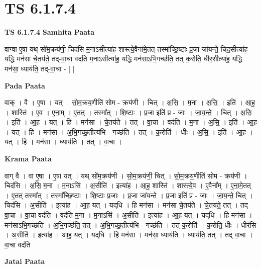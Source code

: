 \documentclass[17pt]{extarticle}
\begin{document}
\section{ TS 6.1.7.4 }

\textbf{TS 6.1.7.4 } \newline
\textbf{Samhita Paata} \newline

वाग्वा ए॒षा यथ् सो॑म॒क्रय॑णी॒ चिद॑सि म॒नाऽसीत्या॑ह॒ शास्त्ये॒वैना॑मे॒तत् तस्मा᳚च्छि॒ष्टाः प्र॒जा जा॑यन्ते॒ चिद॒सीत्या॑ह॒ यद्धि मन॑सा चे॒तय॑ते॒ तद्-वा॒चा वद॑ति म॒नाऽसीत्या॑ह॒ यद्धि मन॑साऽभि॒गच्छ॑ति॒ तत् क॒रोति॒ धीर॒सीत्या॑ह॒ यद्धि मन॑सा॒ ध्याय॑ति॒ तद्-वा॒चा - [  ] \newline

\textbf{Pada Paata} \newline

वाक् । वै । ए॒षा । यत् । सो॒म॒क्रय॒णीति॑ सोम - क्रय॑णी । चित् । अ॒सि॒ । म॒ना । अ॒सि॒ । इति॑ । आ॒ह॒ । शास्ति॑ । ए॒व । ए॒ना॒म् । ए॒तत् । तस्मा᳚त् । शि॒ष्टाः । प्र॒जा इति॑ प्र - जाः । जा॒य॒न्ते॒ । चित् । अ॒सि॒ । इति॑ । आ॒ह॒ । यत् । हि । मन॑सा । चे॒तय॑ते । तत् । वा॒चा । वद॑ति । म॒ना । अ॒सि॒ । इति॑ । आ॒ह॒ । यत् । हि । मन॑सा । अ॒भि॒गच्छ॒तीत्य॑भि - गच्छ॑ति । तत् । क॒रोति॑ । धीः । अ॒सि॒ । इति॑ । आ॒ह॒ । यत् । हि । मन॑सा । ध्याय॑ति । तत् । वा॒चा ।  \newline


\textbf{Krama Paata} \newline

वाग् वै । वा ए॒षा । ए॒षा यत् । यथ् सो॑म॒क्रय॑णी । सो॒म॒क्रय॑णी॒ चित् । सो॒म॒क्रय॒णीति॑ सोम - क्रय॑णी । चिद॑सि । अ॒सि॒ म॒ना । म॒नाऽसि॑ । अ॒सीति॑ । इत्या॑ह । आ॒ह॒ शास्ति॑ । शास्त्ये॒व । ए॒वैना᳚म् । ए॒ना॒मे॒तत् । ए॒तत् तस्मा᳚त् । तस्मा᳚च्छि॒ष्टाः । शि॒ष्टाः प्र॒जाः । प्र॒जा जा॑यन्ते । प्र॒जा इति॑ प्र - जाः । जा॒य॒न्ते॒ चित् । चिद॑सि । अ॒सीति॑ । इत्या॑ह । आ॒ह॒ यत् । यद्‌धि । हि मन॑सा । मन॑सा चे॒तय॑ते । चे॒तय॑ते॒ तत् । तद् वा॒चा । वा॒चा वद॑ति । वद॑ति म॒ना । म॒नाऽसि॑ । अ॒सीति॑ । इत्या॑ह । आ॒ह॒ यत् । यद्‌धि । हि मन॑सा । मन॑साऽभि॒गच्छ॑ति । अ॒भि॒गच्छ॑ति॒ तत् । अ॒भि॒गच्छ॒तीत्य॑भि - गच्छ॑ति । तत् क॒रोति॑ । क॒रोति॒ धीः । धीर॑सि । अ॒सीति॑ । इत्या॑ह । आ॒ह॒ यत् । यद्‌धि । हि मन॑सा । मन॑सा॒ ध्याय॑ति । ध्याय॑ति॒ तत् । तद् वा॒चा । वा॒चा वद॑ति \newline

\textbf{Jatai Paata} \newline
\end{document}
